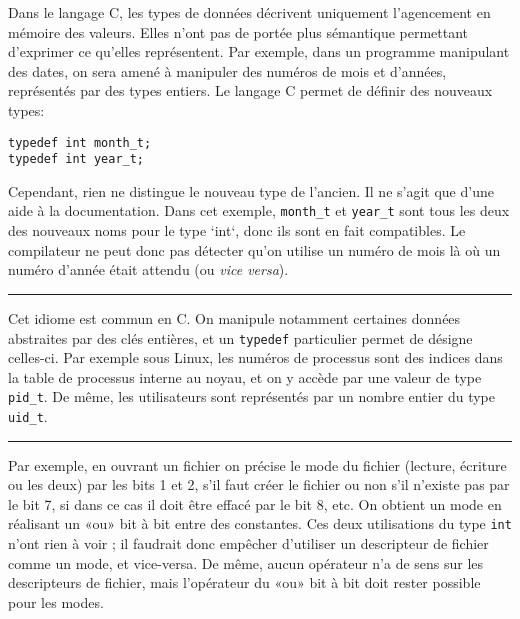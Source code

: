 \def\tBits{\textsc{Bits}\xspace}
\def\tChar{\textsc{Char}\xspace}

Dans le langage C, les types de données décrivent uniquement l'agencement en
mémoire des valeurs. Elles n'ont pas de portée plus sémantique permettant
d'exprimer ce qu'elles représentent. Par exemple, dans un programme manipulant
des dates, on sera amené à manipuler des numéros de mois et d'années,
représentés par des types entiers. Le langage C permet de définir des nouveaux
types:

\begin{verbatim}
typedef int month_t;
typedef int year_t;
\end{verbatim}

Cependant, rien ne distingue le nouveau type de l'ancien. Il ne s'agit que d'une
aide à la documentation. Dans cet exemple, \texttt{month\_t} et \texttt{year\_t}
sont tous les deux des nouveaux noms pour le type `int`, donc ils sont en fait
compatibles. Le compilateur ne peut donc pas détecter qu'on utilise un numéro de
mois là où un numéro d'année était attendu (ou \emph{vice versa}).

\begin{center}\rule{3in}{0.4pt}\end{center}

Cet idiome est commun en C. On manipule notamment certaines données abstraites
par des clés entières, et un \texttt{typedef} particulier permet de désigne
celles-ci. Par exemple sous Linux, les numéros de processus sont des indices
dans la table de processus interne au noyau, et on y accède par une valeur de
type \texttt{pid\_t}. De même, les utilisateurs sont représentés par un nombre
entier du type \texttt{uid\_t}.

\begin{center}\rule{3in}{0.4pt}\end{center}

Par exemple, en ouvrant un fichier on précise le mode du fichier (lecture,
écriture ou les deux) par les bits 1 et 2, s'il faut créer le fichier ou non
s'il n'existe pas par le bit 7, si dans ce cas il doit être effacé par le bit 8,
etc. On obtient un mode en réalisant un «ou» bit à bit entre des constantes. Ces
deux utilisations du type \texttt{int} n'ont rien à voir ; il faudrait donc
empêcher d'utiliser un descripteur de fichier comme un mode, et vice-versa. De
même, aucun opérateur n'a de sens sur les descripteurs de fichier, mais
l'opérateur \texttt{\textbar{}} du «ou» bit à bit doit rester possible pour les
modes.

